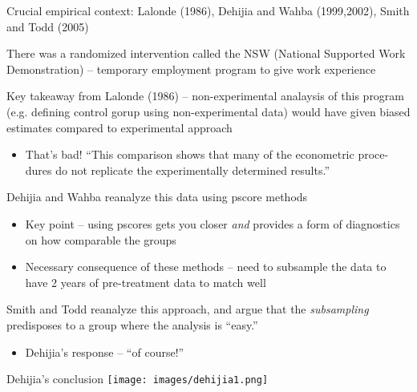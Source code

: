 \documentclass[notes,11pt, aspectratio=169]{beamer}
\newenvironment{wideitemize}{\itemize\addtolength{\itemsep}{10pt}}{\enditemize}
\begin{document}
\begin{frame}{Crucial empirical context: Lalonde (1986), Dehijia and Wahba (1999,2002), Smith and Todd (2005)}
  \begin{wideitemize}
    \item There was a randomized intervention called the NSW (National Supported Work Demonstration) -- temporary employment program to give work experience
    \item Key takeaway from Lalonde (1986) -- non-experimental
      analaysis of this program (e.g. defining control gorup using
      non-experimental data) would have given biased estimates compared to experimental approach
      \begin{itemize}
      \item That's bad! ``This comparison shows that many of the econometric proce-
 dures do not replicate the experimentally determined results.''
      \end{itemize}
    \item Dehijia and Wahba reanalyze this data using pscore methods
      \begin{itemize}
      \item Key point -- using pscores gets you closer \emph{and}
        provides a form of diagnostics on how comparable the groups
      \item Necessary consequence of these methods -- need to
        subsample the data to have 2 years of pre-treatment data to
        match well
      \end{itemize}
    \item Smith and Todd reanalyze this approach, and argue that the
      \emph{subsampling} predisposes to a group where the analysis is ``easy.''
      \begin{itemize}
      \item Dehijia's response -- ``of course!''
      \end{itemize}
      
  \end{wideitemize}
  
\end{frame}

\begin{frame}{Dehijia's conclusion}
\texttt{[image: images/dehijia1.png]}
\end{frame}
\end{document}
